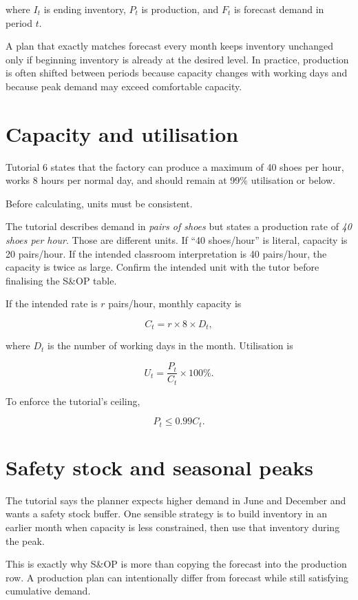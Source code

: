 where $I_t$ is ending inventory, $P_t$ is production, and $F_t$ is forecast demand in period $t$.

A plan that exactly matches forecast every month keeps inventory unchanged only if beginning inventory is already at the desired level. In practice, production is often shifted between periods because capacity changes with working days and because peak demand may exceed comfortable capacity.

\section{Capacity and utilisation}

Tutorial 6 states that the factory can produce a maximum of 40 shoes per hour, works 8 hours per normal day, and should remain at 99\% utilisation or below.

Before calculating, units must be consistent.

\begin{pitfall}
The tutorial describes demand in \emph{pairs of shoes} but states a production rate of \emph{40 shoes per hour}. Those are different units. If ``40 shoes/hour'' is literal, capacity is 20 pairs/hour. If the intended classroom interpretation is 40 pairs/hour, the capacity is twice as large. Confirm the intended unit with the tutor before finalising the S\&OP table.
\end{pitfall}

If the intended rate is $r$ pairs/hour, monthly capacity is

\[
C_t = r\times 8\times D_t,
\]

where $D_t$ is the number of working days in the month. Utilisation is

\[
U_t = \frac{P_t}{C_t}\times 100\%.
\]

To enforce the tutorial's ceiling,

\[
P_t \leq 0.99C_t.
\]

\section{Safety stock and seasonal peaks}

The tutorial says the planner expects higher demand in June and December and wants a safety stock buffer. One sensible strategy is to build inventory in an earlier month when capacity is less constrained, then use that inventory during the peak.

This is exactly why S\&OP is more than copying the forecast into the production row. A production plan can intentionally differ from forecast while still satisfying cumulative demand.

